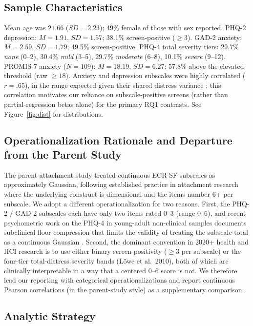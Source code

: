 \documentclass[letterpaper]{article}
\begin{document}
\subsection{Sample Characteristics}
Mean age was $21.66$ ($SD=2.23$); 49\% female of those with sex reported. PHQ-2 depression: $M=1.91$, $SD=1.57$; 38.1\% screen-positive ($\geq 3$). GAD-2 anxiety: $M=2.59$, $SD=1.79$; 49.5\% screen-positive. PHQ-4 total severity tiers: 29.7\% \emph{none} (0--2), 30.4\% \emph{mild} (3--5), 29.7\% \emph{moderate} (6--8), 10.1\% \emph{severe} (9--12). PROMIS-7 anxiety ($N=109$): $M=18.19$, $SD=6.27$; 57.8\% above the elevated threshold (raw $\geq 18$). Anxiety and depression subscales were highly correlated ($r=.65$), in the range expected given their shared distress variance \citep{kroenke2009phq4}; this correlation motivates our reliance on subscale-positive screens (rather than partial-regression betas alone) for the primary RQ1 contrasts. See Figure~\ref{fig:dist} for distributions.

\subsection{Operationalization Rationale and Departure from the Parent Study}
The parent attachment study \citep{anon2026attachment} treated continuous ECR-SF subscales as approximately Gaussian, following established practice in attachment research where the underlying construct is dimensional and the items number 6+ per subscale. We adopt a different operationalization for two reasons. First, the PHQ-2 / GAD-2 subscales each have only two items rated 0--3 (range 0--6), and recent psychometric work on the PHQ-4 in young-adult non-clinical samples documents subclinical floor compression that limits the validity of treating the subscale total as a continuous Gaussian \citep{mavrogiorgou2025collabra,khubchandani2024phq4}. Second, the dominant convention in 2020+ health and HCI research is to use either binary screen-positivity ($\geq 3$ per subscale) or the four-tier total-distress severity bands (Löwe et al.\ 2010), both of which are clinically interpretable in a way that a centered 0--6 score is not. We therefore lead our reporting with categorical operationalizations and report continuous Pearson correlations (in the parent-study style) as a supplementary comparison.

\subsection{Analytic Strategy}
\end{document}
